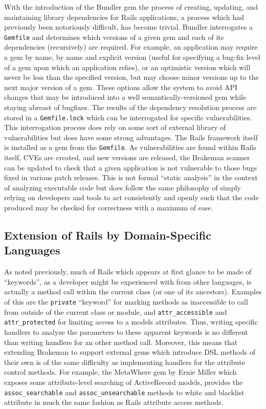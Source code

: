 \documentclass[conference]{IEEEtran}
\begin{document}
With the introduction of the Bundler gem the process of creating, updating, and
maintaining library dependencies for Rails applications, a process which had
previously been notoriously difficult, has become trivial.  Bundler interrogates
a \texttt{Gemfile} and determines which versions of a given gem and each of its
dependencies (recursively) are required.  For example, an application may require
a gem by name, by name and explicit version (useful for specifying a bug-fix
level of a gem upon which an application relies), or an optimistic version which will never be less than the
specified version, but may choose minor versions up to the next major version
of a gem.  These options allow the system to avoid API changes that may be introduced into a well
semantically-versioned gem while staying abreast of bugfixes.  The results of the
dependency resolution process are stored in a \texttt{Gemfile.lock} which can be
interrogated for specific vulnerabilities.  This interrogation process does rely on some
sort of external library of vulnerabilities but does have some strong advantages.  The
Rails framework itself is installed as a gem from the \texttt{Gemfile}.  As
vulnerabilities are found within Rails itself, CVEs are created, and new versions are
released, the Brakeman scanner can be updated to check that a given application is not
vulnerable to those bugs fixed in various patch releases.  This is not formal ``static
analysis'' in the context of analyzing executable code but does follow the same philosophy
of simply relying on developers and tools to act consistently and openly such that the
code produced may be checked for correctness with a maximum of ease.

\subsection{Extension of Rails by Domain-Specific Languages}

As noted previously, much of Rails which appears at first glance to be made of
``keywords'', as a developer might be experienced with from other languages, is
actually a method call within the current class (or one of its ancestors).
Examples of this are the \texttt{private}\cite{private_method} ``keyword'' for
marking methods as inaccessible to call from outside of the current class or
module, and \texttt{attr\_accessible} and \texttt{attr\_protected} for limiting
access to a models attributes.  Thus, writing specific handlers to analyze the
parameters to these apparent keywords is no different than writing handlers for
an other method call.  Moreover, this means that extending Brakeman to support
external gems which introduce DSL methods of their own is of the same difficulty
as implementing handlers for the attribute control methods.  For example, the
MetaWhere gem by Ernie Miller which exposes some attribute-level searching of
ActiveRecord models, provides the \texttt{assoc\_searchable} and
\texttt{assoc\_unsearchable} methods to white and blacklist attribute in much
the same fashion as Rails attribute access methods.
\end{document}
